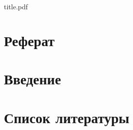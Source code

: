 

\def\oldbibitem{}
\let\oldbibitem=\bibitem
\def\bibitem{\stepcounter{citenum}\oldbibitem}



{title.pdf}

\tableofcontents
\newpage

\section{Реферат}

\section{Введение}


\newpage

\section{Список литературы}
\medskip

\begin{thebibliography}{}
\end{thebibliography}




